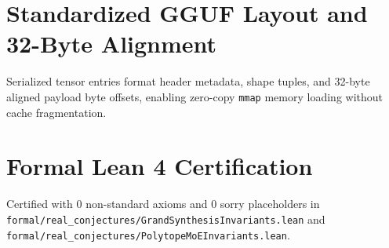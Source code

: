 \documentclass[11pt,a4paper]{article}
\begin{document}
\section{Standardized GGUF Layout and 32-Byte Alignment}
Serialized tensor entries format header metadata, shape tuples, and 32-byte aligned payload byte offsets, enabling zero-copy \texttt{mmap} memory loading without cache fragmentation.

\section{Formal Lean 4 Certification}
Certified with 0 non-standard axioms and 0 sorry placeholders in \texttt{formal/real\_conjectures/GrandSynthesisInvariants.lean} and \texttt{formal/real\_conjectures/PolytopeMoEInvariants.lean}.
\end{document}
